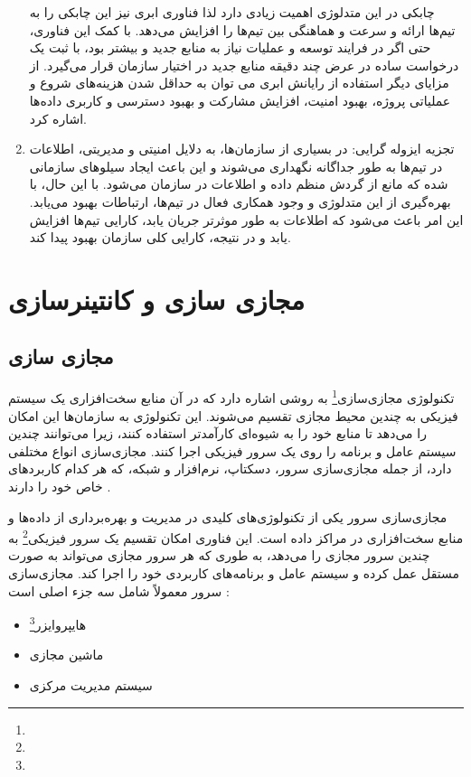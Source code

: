 \begin{enumerate}
چابکی در این متدلوژی اهمیت زیادی دارد لذا فناوری ابری نیز این چابکی را به تیم‌ها ارائه و سرعت و هماهنگی بین تیم‌ها را افزایش می‌دهد. با کمک این فناوری، حتی اگر در فرایند توسعه و عملیات نیاز به منابع جدید و بیشتر بود، با ثبت یک درخواست ساده در عرض چند دقیقه منابع جدید در اختیار سازمان قرار می‌گیرد. از مزایای دیگر استفاده از رایانش ابری می توان به حداقل شدن هزینه‌های شروع و عملیاتی پروژه، بهبود امنیت، افزایش مشارکت و بهبود دسترسی و کاربری داده‌ها اشاره کرد.
	\item
تجزیه ایزوله گرایی: در بسیاری از سازمان‌ها، به دلایل امنیتی و مدیریتی، اطلاعات در تیم‌ها به طور جداگانه نگهداری می‌شوند و این باعث ایجاد سیلوهای سازمانی شده که مانع از گردش منظم داده و اطلاعات در سازمان می‌شود.
با این حال، با بهره‌گیری از این متدلوژی و وجود همکاری فعال در تیم‌ها، ارتباطات بهبود می‌یابد. این امر باعث می‌شود که اطلاعات به طور موثرتر جریان یابد، کارایی تیم‌ها افزایش یابد و در نتیجه، کارایی کلی سازمان بهبود پیدا کند.
\end{enumerate}

\section{مجازی سازی و کانتینرسازی}
\subsection{مجازی سازی}
تکنولوژی مجازی‌سازی\footnote{} به روشی اشاره دارد که در آن منابع سخت‌افزاری یک سیستم فیزیکی به چندین محیط مجازی تقسیم می‌شوند. این تکنولوژی به سازمان‌ها این امکان را می‌دهد تا منابع خود را به شیوه‌ای کارآمدتر استفاده کنند، زیرا می‌توانند چندین سیستم عامل و برنامه را روی یک سرور فیزیکی اجرا کنند. مجازی‌سازی انواع مختلفی دارد، از جمله مجازی‌سازی سرور، دسکتاپ، نرم‌افزار و شبکه، که هر کدام کاربردهای خاص خود را دارند \cite{virtualization1, virtualization2}.

مجازی‌سازی سرور یکی از تکنولوژی‌های کلیدی در مدیریت و بهره‌برداری از داده‌ها و منابع سخت‌افزاری در مراکز داده است. این فناوری امکان تقسیم یک سرور فیزیکی\footnote{} به چندین سرور مجازی را می‌دهد، به طوری که هر سرور مجازی می‌تواند به صورت مستقل عمل کرده و سیستم عامل و برنامه‌های کاربردی خود را اجرا کند. مجازی‌سازی سرور معمولاً شامل سه جزء اصلی است \cite{virtualization1}:
\begin{itemize}
	\item 
هایپروایزر\footnote{}
	\item
ماشین مجازی
	\item 
سیستم مدیریت مرکزی
\end{itemize}

